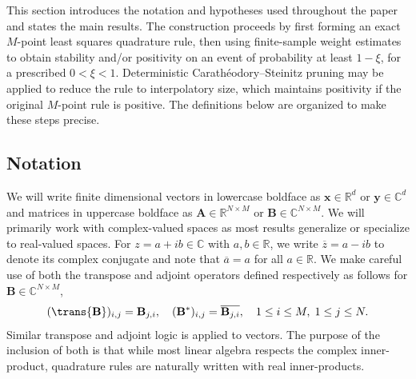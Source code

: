 \documentclass[10pt,dvipsnames]{amsart}
\begin{document}
\label{sec:preliminaries}
This section introduces the notation and hypotheses used throughout the
paper and states the main results.  The construction proceeds by first forming
an exact \(M\)-point least squares quadrature rule, then using finite-sample
weight estimates to obtain stability and/or positivity on an
event of probability at least \(1-\xi\), for a prescribed \(0<\xi<1\).
Deterministic Carath\'eodory--Steinitz pruning may
be applied to reduce the rule to interpolatory size, which maintains positivity
if the original $M$-point rule is positive. The definitions below are organized
to make these steps precise. 

\subsection{Notation}
\label{ssec:notation}

We will write finite dimensional vectors in lowercase boldface as $\mathbf{x}\in\mathbb{R}^d$ or $\mathbf{y}\in\mathbb{C}^d$ and matrices in uppercase boldface as $\mathbf{A}\in\mathbb{R}^{N\times M}$ or $\mathbf{B}\in\mathbb{C}^{N\times M}$. We will primarily work with complex-valued spaces as most results generalize or specialize to real-valued spaces. For $z = a + ib \in \mathbb{C}$ with $a,b\in\mathbb{R}$, we write $\overline{z}=a-ib$ to denote its complex conjugate and note that $\overline{a}=a$ for all $a\in\mathbb{R}$. We make careful use of both the transpose and adjoint operators defined respectively as follows for $\mathbf{B}\in\mathbb{C}^{N\times M}$,
\[(\trans{\mathbf{B}})_{i,j} = \mathbf{B}_{j,i},\quad (\mathbf{B}^*)_{i,j} = \overline{\mathbf{B}_{j,i}},\quad 1\leq i\leq M,\;1\leq j\leq N.\]
Similar transpose and adjoint logic is applied to vectors. The purpose of the inclusion of both is that while most linear algebra respects the complex inner-product, quadrature rules are naturally written with real inner-products. 
\end{document}
